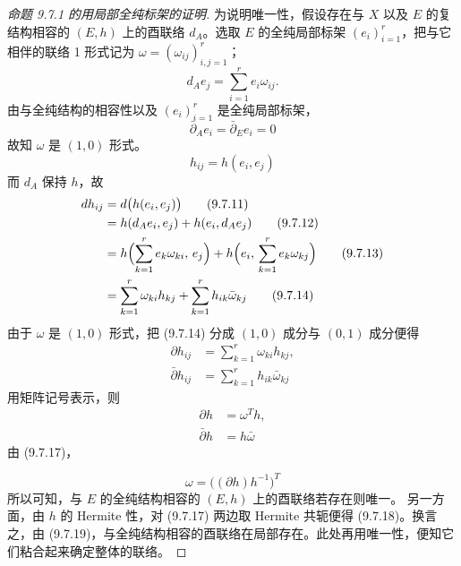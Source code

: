 
\begin{proof}[命题 9.7.1 的用局部全纯标架的证明]
为说明唯一性，假设存在与 $X$ 以及 $E$ 的复结构相容的 $(E,h)$ 上的酉联络 $d_A$。选取 $E$ 的全纯局部标架 $(e_i)_{i=1}^r$，把与它相伴的联络 1 形式记为 $\omega=(\omega_{ij})_{i,j=1}^r$；
\begin{equation}
  d_A e_j = \sum_{i=1}^r e_i \omega_{ij}.
  \tag{9.7.8}
\end{equation}
由与全纯结构的相容性以及 $(e_i)_{i=1}^r$ 是全纯局部标架，
\begin{equation}
  \bar\partial_A e_i = \bar\partial_E e_i = 0
  \tag{9.7.9}
\end{equation}
故知 $\omega$ 是 $(1,0)$ 形式。
\begin{equation}
  h_{ij} = h(e_i,e_j)
  \tag{9.7.10}
\end{equation}
而 $d_A$ 保持 $h$，故
\begin{align}
  dh_{ij} &= d\bigl(h(e_i,e_j)\bigr)
  \tag{9.7.11}\\
  &= h(d_A e_i, e_j) + h(e_i, d_A e_j)
  \tag{9.7.12}\\
  &= h\Bigl(\sum_{k=1}^r e_k\omega_{ki},\, e_j\Bigr)
     + h\Bigl(e_i,\, \sum_{k=1}^r e_k\omega_{kj}\Bigr)
  \tag{9.7.13}\\
  &= \sum_{k=1}^r \omega_{ki} h_{kj} + \sum_{k=1}^r h_{ik}\bar\omega_{kj}
  \tag{9.7.14}
\end{align}
由于 $\omega$ 是 $(1,0)$ 形式，把 (9.7.14) 分成 $(1,0)$ 成分与 $(0,1)$ 成分便得
\begin{align}
  \partial h_{ij} &= \sum_{k=1}^r \omega_{ki} h_{kj},
  \tag{9.7.15}\\
  \bar\partial h_{ij} &= \sum_{k=1}^r h_{ik}\bar\omega_{kj}
  \tag{9.7.16}
\end{align}
用矩阵记号表示，则
\begin{align}
  \partial h &= \omega^T h,
  \tag{9.7.17}\\
  \bar\partial h &= h\bar\omega
  \tag{9.7.18}
\end{align}
由 (9.7.17)，

\begin{equation}
  \omega = \bigl((\partial h)h^{-1}\bigr)^T
  \tag{9.7.19}
\end{equation}
所以可知，与 $E$ 的全纯结构相容的 $(E,h)$ 上的酉联络若存在则唯一。
另一方面，由 $h$ 的 Hermite 性，对 (9.7.17) 两边取 Hermite 共轭便得 (9.7.18)。换言之，由 (9.7.19)，与全纯结构相容的酉联络在局部存在。此处再用唯一性，便知它们粘合起来确定整体的联络。
\end{proof}


